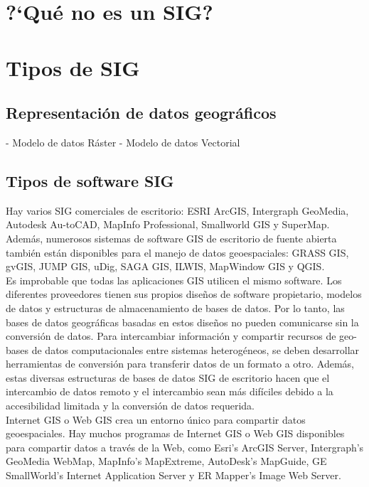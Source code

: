 \section{?`Qué no es un SIG?}




\section{Tipos de SIG}


\subsection{Representación de datos geográficos}

- Modelo de datos Ráster
- Modelo de datos Vectorial

\subsection{Tipos de software SIG}


Hay varios SIG comerciales de escritorio: ESRI ArcGIS, Intergraph GeoMedia, Autodesk Au-toCAD, MapInfo Professional, Smallworld GIS y SuperMap.\\

Además, numerosos sistemas de software GIS de escritorio de fuente abierta también están disponibles para el manejo de datos geoespaciales: GRASS GIS, gvGIS, JUMP GIS, uDig, SAGA GIS, ILWIS, MapWindow GIS y QGIS.\\

Es improbable que todas las aplicaciones GIS utilicen el mismo software. Los diferentes proveedores tienen sus propios diseños de software propietario, modelos de datos y estructuras de almacenamiento de bases de datos. Por lo tanto, las bases de datos geográficas basadas en estos diseños no pueden comunicarse sin la conversión de datos. Para intercambiar información y compartir recursos de geo-bases de datos computacionales entre sistemas heterogéneos, se deben desarrollar herramientas de conversión para transferir datos de un formato a otro. Además, estas diversas estructuras de bases de datos SIG de escritorio hacen que el intercambio de datos remoto y el intercambio sean más difíciles debido a la accesibilidad limitada y la conversión de datos requerida.\\

Internet GIS o Web GIS crea un entorno único para compartir datos geoespaciales. Hay muchos programas de Internet GIS o Web GIS disponibles para compartir datos a través de la Web, como Esri’s ArcGIS Server, Intergraph’s GeoMedia WebMap, MapInfo’s MapExtreme, AutoDesk’s MapGuide, GE SmallWorld’s Internet Application Server y ER Mapper’s Image Web Server.\\

